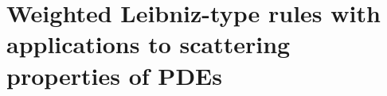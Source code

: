 \cleardoublepage

\chapter{Weighted Leibniz-type rules with applications to scattering properties of PDEs}
